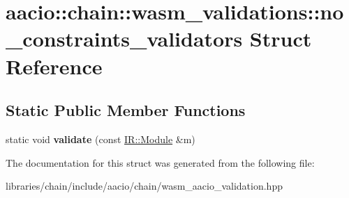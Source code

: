 \hypertarget{structaacio_1_1chain_1_1wasm__validations_1_1no__constraints__validators}{}\section{aacio\+:\+:chain\+:\+:wasm\+\_\+validations\+:\+:no\+\_\+constraints\+\_\+validators Struct Reference}
\label{structaacio_1_1chain_1_1wasm__validations_1_1no__constraints__validators}
\subsection*{Static Public Member Functions}
\begin{DoxyCompactItemize}
\item 
\mbox{\label{structaacio_1_1chain_1_1wasm__validations_1_1no__constraints__validators_a17e8bf471d8b6551a352227c942114b1}} 
static void {\bfseries validate} (const \mbox{\hyperlink{struct_i_r_1_1_module}{I\+R\+::\+Module}} \&m)
\end{DoxyCompactItemize}


The documentation for this struct was generated from the following file\+:\begin{DoxyCompactItemize}
\item 
libraries/chain/include/aacio/chain/wasm\+\_\+aacio\+\_\+validation.\+hpp\end{DoxyCompactItemize}
